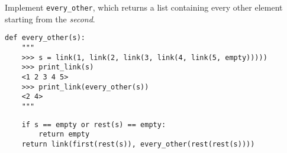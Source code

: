 \begin{blocksection}
\question Implement \lstinline$every_other$, which returns a list containing every other
element starting from the \emph{second}.

\begin{lstlisting}
def every_other(s):
    """
    >>> s = link(1, link(2, link(3, link(4, link(5, empty)))))
    >>> print_link(s)
    <1 2 3 4 5>
    >>> print_link(every_other(s))
    <2 4>
    """
\end{lstlisting}

\begin{solution}[1.5in]
\begin{lstlisting}
    if s == empty or rest(s) == empty:
        return empty
    return link(first(rest(s)), every_other(rest(rest(s))))
\end{lstlisting}
\end{solution}
\end{blocksection}